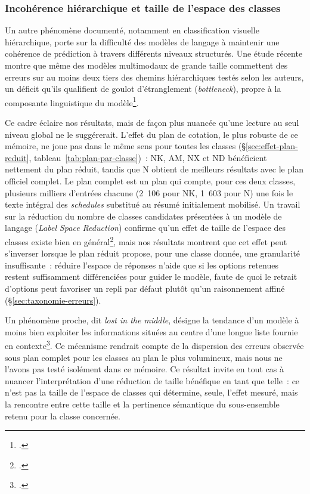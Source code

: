 \subsubsection*{Incohérence hiérarchique et taille de l'espace des classes}

Un autre phénomène documenté, notamment en classification visuelle hiérarchique, porte sur la difficulté des modèles de langage à maintenir une cohérence de prédiction à travers différents niveaux structurés. Une étude récente montre que même des modèles multimodaux de grande taille commettent des erreurs sur au moins deux tiers des chemins hiérarchiques testés selon les auteurs, un déficit qu'ils qualifient de goulot d'étranglement (\textit{bottleneck}), propre à la composante linguistique du modèle\footcite{bottleneck2026}.

Ce cadre éclaire nos résultats, mais de façon plus nuancée qu'une lecture au seul niveau global ne le suggérerait. L'effet du plan de cotation, le plus robuste de ce mémoire, ne joue pas dans le même sens pour toutes les classes (\S\ref{sec:effet-plan-reduit}, tableau~\ref{tab:plan-par-classe})~: NK, AM, NX et ND bénéficient nettement du plan réduit, tandis que N obtient de meilleurs résultats avec le plan officiel complet. Le plan complet est un plan qui compte, pour ces deux classes, plusieurs milliers d'entrées chacune (2~106 pour NK, 1~603 pour N) une fois le texte intégral des \textit{schedules} substitué au résumé initialement mobilisé. Un travail sur la réduction du nombre de classes candidates présentées à un modèle de langage (\textit{Label Space Reduction}) confirme qu'un effet de taille de l'espace des classes existe bien en général\footcite{vandemoortele2025}, mais nos résultats montrent que cet effet peut s'inverser lorsque le plan réduit propose, pour une classe donnée, une granularité insuffisante~: réduire l'espace de réponses n'aide que si les options retenues restent suffisamment différenciées pour guider le modèle, faute de quoi le retrait d'options peut favoriser un repli par défaut plutôt qu'un raisonnement affiné (\S\ref{sec:taxonomie-erreurs}).

Un phénomène proche, dit \textit{lost in the middle}, désigne la tendance d'un modèle à moins bien exploiter les informations situées au centre d'une longue liste fournie en contexte\footcite{liu2023}. Ce mécanisme rendrait compte de la dispersion des erreurs observée sous plan complet pour les classes au plan le plus volumineux, mais nous ne l'avons pas testé isolément dans ce mémoire. Ce résultat invite en tout cas à nuancer l'interprétation d'une réduction de taille bénéfique en tant que telle~: ce n'est pas la taille de l'espace de classes qui détermine, seule, l'effet mesuré, mais la rencontre entre cette taille et la pertinence sémantique du sous-ensemble retenu pour la classe concernée.

